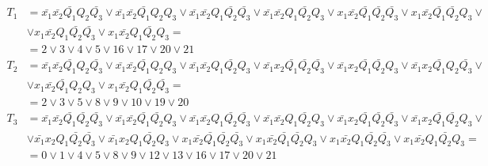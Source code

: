 \documentclass[listings]{labreport}
\begin{document}
\begin{align*}
T_1 & = \bar{x_1}\bar{x_2}\bar{Q_1}Q_2\bar{Q_3} \lor \bar{x_1}\bar{x_2}\bar{Q_1}Q_2Q_3 \lor \bar{x_1}\bar{x_2}Q_1\bar{Q_2}\bar{Q_3} \lor \bar{x_1}\bar{x_2}Q_1\bar{Q_2}Q_3 \lor x_1\bar{x_2}\bar{Q_1}\bar{Q_2}\bar{Q_3} \lor x_1\bar{x_2}\bar{Q_1}\bar{Q_2}Q_3 \lor \\ & \lor x_1\bar{x_2}Q_1\bar{Q_2}\bar{Q_3} \lor x_1\bar{x_2}Q_1\bar{Q_2}Q_3 = \\ & = 2 \lor 3 \lor 4 \lor 5 \lor 16 \lor 17 \lor 20 \lor 21 \\
T_2 & = \bar{x_1}\bar{x_2}\bar{Q_1}Q_2\bar{Q_3} \lor \bar{x_1}\bar{x_2}\bar{Q_1}Q_2Q_3 \lor \bar{x_1}\bar{x_2}Q_1\bar{Q_2}Q_3 \lor \bar{x_1}x_2\bar{Q_1}\bar{Q_2}\bar{Q_3} \lor \bar{x_1}x_2\bar{Q_1}\bar{Q_2}Q_3 \lor \bar{x_1}x_2\bar{Q_1}Q_2\bar{Q_3} \lor \\ & \lor x_1\bar{x_2}\bar{Q_1}Q_2Q_3 \lor x_1\bar{x_2}Q_1\bar{Q_2}\bar{Q_3}   = \\ & = 2 \lor 3 \lor 5 \lor 8 \lor 9 \lor 10 \lor 19 \lor 20 \\
T_3 & = \bar{x_1}\bar{x_2}\bar{Q_1}\bar{Q_2}\bar{Q_3} \lor \bar{x_1}\bar{x_2}\bar{Q_1}\bar{Q_2}Q_3 \lor \bar{x_1}\bar{x_2}Q_1\bar{Q_2}\bar{Q_3} \lor \bar{x_1}\bar{x_2}Q_1\bar{Q_2}Q_3 \lor \bar{x_1}x_2\bar{Q_1}\bar{Q_2}\bar{Q_3} \lor \bar{x_1}x_2\bar{Q_1}\bar{Q_2}Q_3 \lor \\ & \lor \bar{x_1}x_2Q_1\bar{Q_2}\bar{Q_3} \lor \bar{x_1}x_2Q_1\bar{Q_2}Q_3 \lor x_1\bar{x_2}\bar{Q_1}\bar{Q_2}\bar{Q_3} \lor x_1\bar{x_2}\bar{Q_1}\bar{Q_2}Q_3 \lor x_1\bar{x_2}Q_1\bar{Q_2}\bar{Q_3} \lor x_1\bar{x_2}Q_1\bar{Q_2}Q_3 = \\ & = 0 \lor 1 \lor 4 \lor 5 \lor 8 \lor 9 \lor 12 \lor 13 \lor 16 \lor 17 \lor 20 \lor 21
\end{align*}
\end{document}
